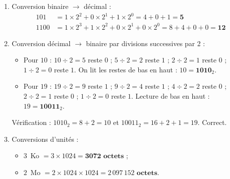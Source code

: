 \documentclass[11pt]{article}
\begin{document}
\begin{corrige}
\begin{enumerate}
\item Conversion binaire $\rightarrow$ décimal :
\begin{align*}
101 &= 1\times 2^2 + 0\times 2^1 + 1\times 2^0 = 4 + 0 + 1 = \textbf{5} \\
1100 &= 1\times 2^3 + 1\times 2^2 + 0\times 2^1 + 0\times 2^0 = 8 + 4 + 0 + 0 = \textbf{12}
\end{align*}
\item Conversion décimal $\rightarrow$ binaire par divisions successives par 2 :
\begin{itemize}
\item Pour $10$ : $10 \div 2 = 5$ reste $0$ ; $5 \div 2 = 2$ reste $1$ ; $2 \div 2 = 1$ reste $0$ ; $1 \div 2 = 0$ reste $1$. On lit les restes de bas en haut : $10 = \textbf{1010}_2$.
\item Pour $19$ : $19 \div 2 = 9$ reste $1$ ; $9 \div 2 = 4$ reste $1$ ; $4 \div 2 = 2$ reste $0$ ; $2 \div 2 = 1$ reste $0$ ; $1 \div 2 = 0$ reste $1$. Lecture de bas en haut : $19 = \textbf{10011}_2$.
\end{itemize}
Vérification : $1010_2 = 8 + 2 = 10$ et $10011_2 = 16 + 2 + 1 = 19$. Correct.
\item Conversions d'unités :
\begin{itemize}
\item $3$~Ko $= 3 \times 1024 = \textbf{3072 octets}$ ;
\item $2$~Mo $= 2 \times 1024 \times 1024 = \textbf{$2\,097\,152$ octets}$.
\end{itemize}
\end{enumerate}
\end{corrige}
\end{document}
